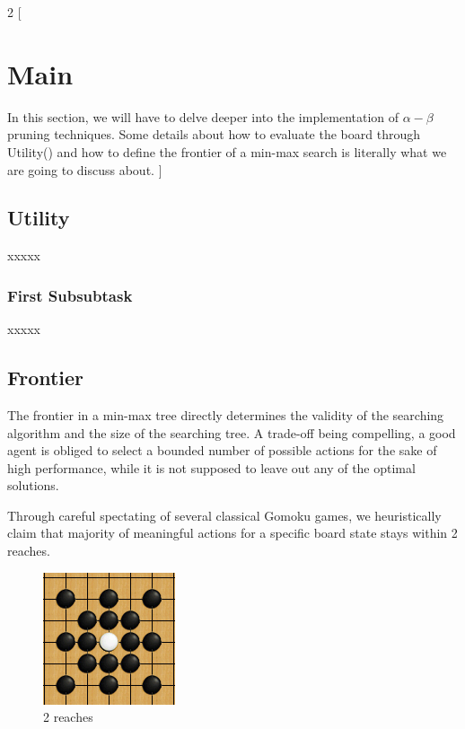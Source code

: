 \documentclass[a4paper, 11pt]{article} %
\begin{document}
\begin{multicols}{2}
    [
        \section{Main}
        In this section, we will have to delve deeper into the implementation of $\alpha-\beta$ pruning techniques. Some details about how to evaluate the board through Utility() and how to define the frontier of a min-max search is literally what we are going to discuss about.
    ]

    \subsection{Utility}
    xxxxx

    \subsubsection{First Subsubtask}
    xxxxx

    \subsection{Frontier}
    The frontier in a min-max tree directly determines the validity of the searching algorithm and the size of the searching tree. A trade-off being compelling, a good agent is obliged to select a bounded number of possible actions for the sake of high performance, while it is not supposed to leave out any of the optimal solutions.
    
    Through careful spectating of several classical Gomoku games, we heuristically claim that majority of meaningful actions for a specific board state stays within 2 reaches.
        
    \begin{figure}[H]
    	\centering
    	\parbox{0.5\linewidth}{
    		\includegraphics[width=\linewidth]{frontier.png}
    	}
    	\caption{2 reaches}
    \end{figure}
    

\end{multicols}
\end{document}
